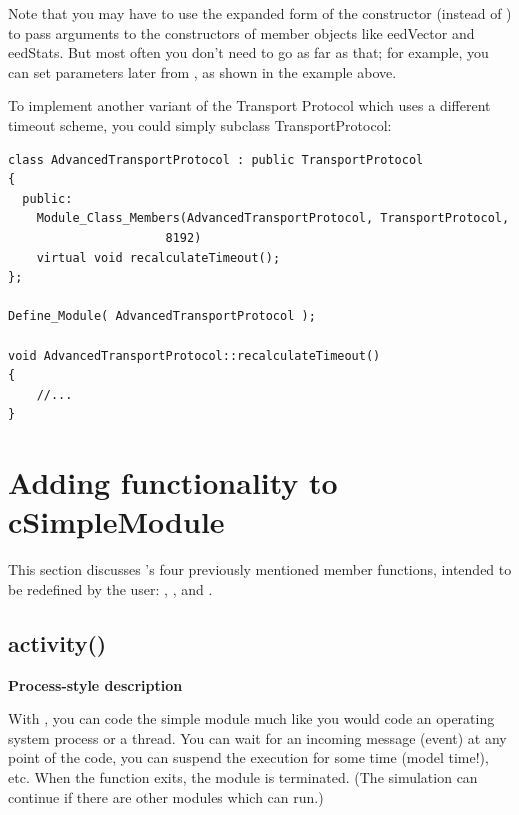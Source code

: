 \begin{sloppypar}
  Note that you may have to use the expanded form of the
  constructor (instead of
  ) to pass arguments to the constructors
  of member objects like eedVector and eedStats. But most often you
  don't need to go as far as that; for example, you can set parameters
  later from , as shown in the example above.
\end{sloppypar}

To implement another variant of the Transport Protocol which uses a
different timeout scheme, you could simply subclass TransportProtocol:

\begin{Verbatim}
class AdvancedTransportProtocol : public TransportProtocol
{
  public:
    Module_Class_Members(AdvancedTransportProtocol, TransportProtocol,
                      8192)
    virtual void recalculateTimeout();
};

Define_Module( AdvancedTransportProtocol );

void AdvancedTransportProtocol::recalculateTimeout()
{
    //...
}
\end{Verbatim}




\section{Adding functionality to cSimpleModule}

This section discusses 's four previously
mentioned member functions, intended to be redefined by the user:
, ,  and
.


\subsection{activity()}

\textbf{Process-style description}

With , you can code the simple
module much like you would code an operating system process or a
thread. You can wait for an incoming message (event) at any point of
the code, you can suspend the execution for some time (model time!),
etc. When the  function exits, the module is
terminated.  (The simulation can continue if there are other modules
which can run.)


